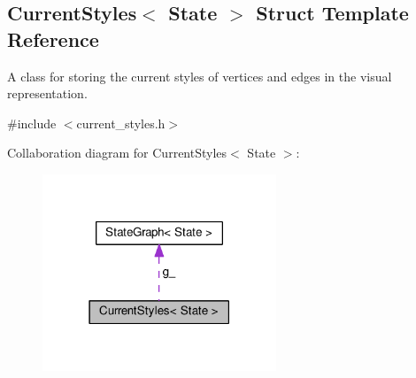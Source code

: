 \hypertarget{structCurrentStyles}{}\subsection{Current\+Styles$<$ State $>$ Struct Template Reference}
\label{structCurrentStyles}


A class for storing the current styles of vertices and edges in the visual representation.  




{\ttfamily \#include $<$current\+\_\+styles.\+h$>$}



Collaboration diagram for Current\+Styles$<$ State $>$\+:\nopagebreak
\begin{figure}[H]
\begin{center}
\leavevmode
\includegraphics[width=198pt]{structCurrentStyles__coll__graph}
\end{center}
\end{figure}
